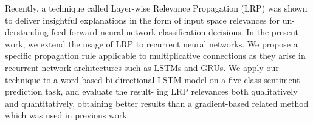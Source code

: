 Recently, a technique called Layer-wise Relevance Propagation (LRP) was shown to deliver insightful explanations in the form of input space relevances for un- derstanding feed-forward neural network classification decisions. In the present work, we extend the usage of LRP to recurrent neural networks. We propose a specific propagation rule applicable to multiplicative connections as they arise in recurrent network architectures such as LSTMs and GRUs. We apply our technique to a word-based bi-directional LSTM model on a five-class sentiment prediction task, and evaluate the result- ing LRP relevances both qualitatively and quantitatively, obtaining better results than a gradient-based related method which was used in previous work.
